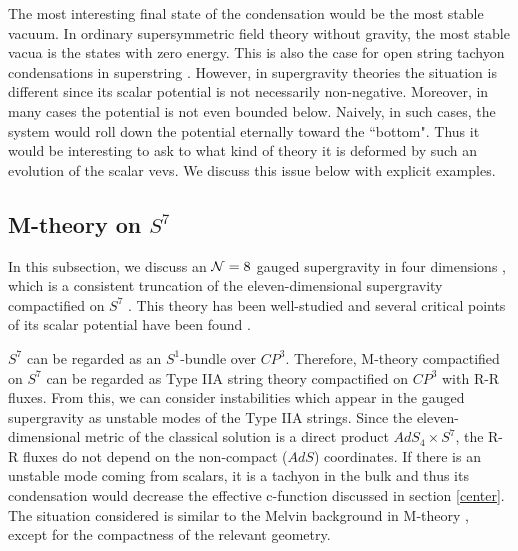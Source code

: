 \documentclass[a4paper,a4paper]{article}
\begin{document}
The most interesting final state of the condensation would be the most stable vacuum. 
In ordinary supersymmetric field theory without gravity, the most stable vacua is the states with zero energy. 
This is also the case for open string tachyon condensations in superstring \cite{open}. 
However, in supergravity theories the situation is different since its scalar potential is not necessarily 
non-negative. 
Moreover, in many cases the potential is not even bounded below. 
Naively, in such cases, the system would roll down the potential eternally toward the ``bottom". 
Thus it would be interesting to ask to what kind of theory it is deformed by such an evolution of the scalar vevs. 
We discuss this issue below with explicit examples. 




















\vspace{5mm}

\subsection{M-theory on $S^7$}

\vspace{5mm}

In this subsection, we discuss an ${\cal N}=8$ gauged supergravity in four dimensions \cite{CJ}, which is a 
consistent truncation of the eleven-dimensional supergravity compactified on $S^7$ \cite{truncation}. 
This theory has been well-studied and several critical points of its scalar potential have been found 
\cite{extrema}. 

$S^7$ can be regarded as an $S^1$-bundle over $CP^3$. 
Therefore, M-theory compactified on $S^7$ can be regarded as Type IIA string theory compactified on $CP^3$ with 
R-R fluxes. 
From this, we can consider instabilities which appear in the gauged supergravity as unstable modes of the Type IIA 
strings. 
Since the eleven-dimensional metric of the classical solution is a direct product $AdS_4\times S^7$, the R-R 
fluxes do not depend on the non-compact ($AdS$) coordinates. 
If there is an unstable mode coming from scalars, it is a tachyon in the bulk and thus its condensation would 
decrease the effective c-function discussed in section \ref{center}. 
The situation considered is similar to the Melvin background in M-theory \cite{Melvin}, except for the 
compactness of the relevant geometry. 
\end{document}
